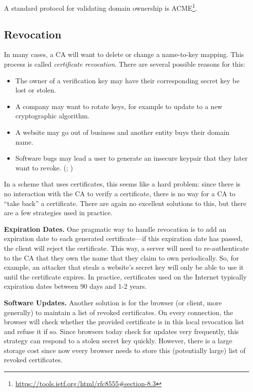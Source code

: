 \documentclass[
  letterpaper,
]{scrbook}
\providecommand{\tightlist}{%
  \setlength{\itemsep}{0pt}\setlength{\parskip}{0pt}}
\theoremstyle{definition}
\theoremstyle{plain}
\theoremstyle{plain}
\theoremstyle{remark}
\begin{document}
A standard protocol for validating domain ownership is ACME\footnote{\url{https://tools.ietf.org/html/rfc8555\#section-8.3}}.

\subsection{Revocation}\label{revocation}

In many cases, a CA will want to delete or change a name-to-key mapping.
This process is called \emph{certificate revocation}. There are several
possible reasons for this:

\begin{itemize}
\tightlist
\item
  The owner of a verification key may have their corresponding secret
  key be lost or stolen.
\item
  A company may want to rotate keys, for example to update to a new
  cryptographic algorithm.
\item
  A website may go out of business and another entity buys their domain
  name.
\item
  Software bugs may lead a user to generate an insecure keypair that
  they later want to revoke. (; )
\end{itemize}

In a scheme that uses certificates, this seems like a hard problem:
since there is no interaction with the CA to verify a certificate, there
is no way for a CA to ``take back'' a certificate. There are again no
excellent solutions to this, but there are a few strategies used in
practice.

\textbf{Expiration Dates.} One pragmatic way to handle revocation is to
add an expiration date to each generated certificate---if this
expiration date has passed, the client will reject the certificate. This
way, a server will need to re-authenticate to the CA that they own the
name that they claim to own periodically. So, for example, an attacker
that steals a website's secret key will only be able to use it until the
certificate expires. In practice, certificates used on the Internet
typically expiration dates between 90 days and 1-2 years.

\textbf{Software Updates.} Another solution is for the browser (or
client, more generally) to maintain a list of revoked certificates. On
every connection, the browser will check whether the provided
certificate is in this local revocation list and refuse it if so. Since
browsers today check for updates very frequently, this strategy can
respond to a stolen secret key quickly. However, there is a large
storage cost since now every browser needs to store this (potentially
large) list of revoked certificates.
\end{document}
